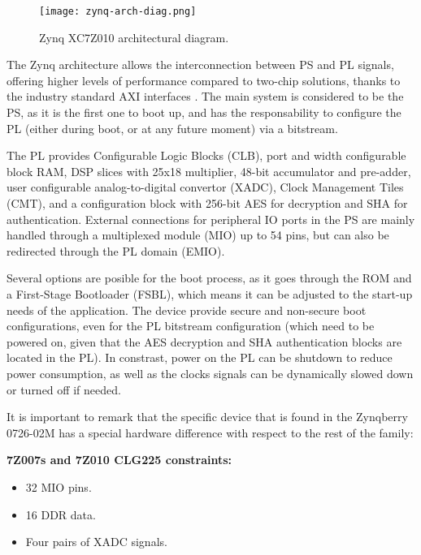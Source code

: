 \begin{figure}
	\centering
	\texttt{[image: zynq-arch-diag.png]}
	\caption{Zynq XC7Z010 architectural diagram.} \label{fig:zynq-arch-diag}
\end{figure}

The Zynq architecture allows the interconnection between PS  and PL signals, offering higher levels of performance compared to two-chip solutions, thanks to the industry standard AXI interfaces \cite{Crokett2014}. The main system is considered to be the PS, as it is the first one to boot up, and has the responsability to configure the PL (either during boot, or at any future moment) via a bitstream.

The PL provides Configurable Logic Blocks (CLB), port and width configurable block RAM, DSP slices with 25x18 multiplier, 48-bit accumulator and pre-adder, user configurable analog-to-digital convertor (XADC), Clock Management Tiles (CMT), and a configuration block with 256-bit AES for decryption and SHA for authentication. External connections for peripheral IO ports in the PS are mainly handled through a multiplexed module (MIO) up to 54 pins, but can also be redirected through the PL domain (EMIO).

Several options are posible for the boot process, as it goes through the ROM and a First-Stage Bootloader (FSBL), which means it can be adjusted to the start-up needs of the application. The device provide secure and non-secure boot configurations, even for the PL bitstream configuration (which need to be powered on, given that the AES decryption and SHA authentication blocks are located in the PL). In constrast, power on the PL can be shutdown to reduce power consumption, as well as the clocks signals can be dynamically slowed down or turned off if needed.


It is important to remark that the specific device that is found in the Zynqberry 0726-02M has a special hardware difference with respect to the rest of the family:
\begin{quote} 
	\centering 
\end{quote}
\textbf{7Z007s and 7Z010 CLG225 constraints:}
\begin{itemize}
	\item 32 MIO pins.
	\item 16 DDR data.
	\item Four pairs of XADC signals.
\end{itemize}

